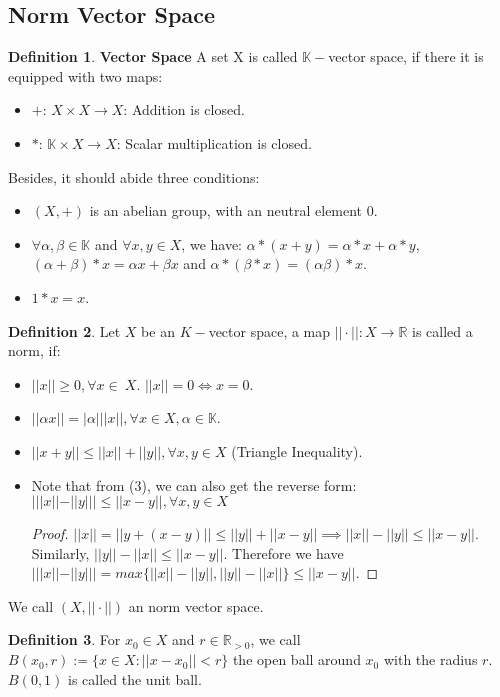 \documentclass{article}
\theoremstyle{definition}
\newtheorem{defi}{Definition}[subsection]
\begin{document}
\subsection{Norm Vector Space}
\begin{defi}
\textbf{Vector Space} A set X is called $\mathbb{K}-$vector space, if there it is equipped with two maps: 
\begin{itemize}
    \item $+$: $X\times X \to X$: Addition is closed.
    \item $\ast$: $\mathbb{K}\times X\to X$: Scalar multiplication is closed.
\end{itemize}
Besides, it should abide three conditions:
\begin{itemize}
    \item $(X,+)$ is an abelian group, with an neutral element $0$.
    \item $\forall \alpha, \beta\in\mathbb{K}$ and $\forall x,y \in X$, we have: $\alpha \ast (x+y)=\alpha\ast x + \alpha\ast y$, $(\alpha+\beta)\ast x = \alpha x + \beta x$ and $\alpha \ast (\beta \ast x)=(\alpha\beta)\ast x$.
    \item $1\ast x=x$.
\end{itemize}
\end{defi}
\begin{defi}
Let $X$ be an $K-$vector space, a map $||\cdot||: X\to\mathbb{R}$ is called a norm, if:
\begin{itemize}
    \item $||x||\geq 0, \forall x\in\ X$. $||x||=0 \Leftrightarrow x=0$.
    \item $||\alpha x||=|\alpha|||x||, \forall x\in X, \alpha \in\mathbb{K}$.
    \item $||x+y||\leq ||x|| + ||y||, \forall x,y \in X$ (Triangle Inequality).
    \item Note that from (3), we can also get the reverse form: $|||x|| - ||y||| \leq ||x-y||, \forall x,y \in X$
    \begin{proof}
    $||x|| = ||y+(x-y)|| \leq ||y|| + ||x-y|| \implies ||x||-||y|| \leq ||x-y||$.
    Similarly, $||y||-||x|| \leq ||x-y||$. Therefore we have $|||x||-||y||| = max\{||x||-||y||, ||y||-||x||\}\leq ||x-y||$.
    \end{proof}
\end{itemize}
\end{defi}
We call $(X, ||\cdot||)$ an norm vector space.
\begin{defi}
For $x_0\in X$ and $r\in\mathbb{R}_{>0}$, we call $B(x_0,r):=\{x\in X: ||x-x_0||<r\}$  the open ball around $x_0$ with the radius $r$. $B(0,1)$ is called the unit ball.
\end{defi}
\end{document}
